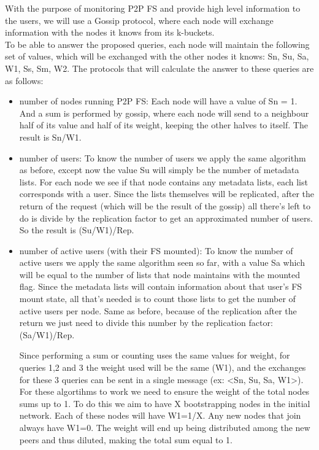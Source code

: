 \documentclass[times,9pt,article]{llncs}
\begin{document}
With the purpose of monitoring P2P FS and provide high level information to the 
users, we will use a Gossip protocol, where each node will exchange information
with the nodes it knows from its k-buckets.\\
To be able to answer the proposed queries, each node will maintain the following
set of values, which will be exchanged with the other nodes it knows: Sn, Su, Sa,
W1, Ss, Sm, W2. The protocols that will calculate the answer to these queries are
as follows:
\begin{itemize}
\item number of nodes running P2P FS:
Each node will have a value of Sn = 1. And a sum is performed by gossip, where each 
node will send to a neighbour half of its value and half of its weight, keeping the 
other halves to itself. The result is Sn/W1.

\item number of users:
To know the number of users we apply the same algorithm as before, except now 
the value Su will simply be the number of metadata lists. For each node we see if
that node contains any metadata lists, each list corresponds with a user. Since 
the lists themselves will be replicated, after the return of the request (which will
be the result of the gossip) all there's left to do is divide by the replication 
factor to get an approximated number of users. So the result is (Su/W1)/Rep.

\item number of active users (with their FS mounted):
To know the number of active users we apply the same algorithm seen so far, with a
value Sa which will be equal to the number of lists that node maintains with the
mounted flag. Since the metadata lists will contain information about that user's
FS mount state, all that's needed is to count those lists to get the number of
active users per node. Same as before, because of the replication after the return
we just need to divide this number by the replication factor: (Sa/W1)/Rep.

Since performing a sum or counting uses the same values for weight, for queries 1,2 
and 3 the weight used will be the same (W1), and the exchanges for these 3 queries 
can be sent in a single message (ex: \textless Sn, Su, Sa, W1\textgreater). For these algortihms to work 
we need to ensure the weight of the total nodes sums up to 1. To do this we aim to
have X bootstrapping nodes in the initial network. Each of these nodes will have 
W1=1/X. 
Any new nodes that join always have W1=0. The weight will end up being distributed 
among the new peers and thus diluted, making the total sum equal to 1.


\end{itemize}
\end{document}
